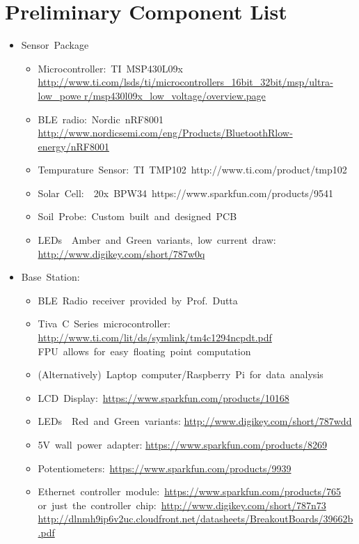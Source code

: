 \documentclass{article}
\begin{document}
\section{Preliminary Component List}
\begin{itemize}
    \item Sensor Package
        \begin{itemize}
            \item Microcontroller: TI MSP430L09x
                \url{http://www.ti.com/lsds/ti/microcontrollers_16­bit_32­bit/msp/ultra­low_powe
                r/msp430l09x_low_voltage/overview.page}
            \item BLE radio: Nordic nRF8001
                \url{http://www.nordicsemi.com/eng/Products/Bluetooth­R­low­energy/nRF8001}
            \item Tempurature Sensor: TI TMP102 http://www.ti.com/product/tmp102
            \item Solar Cell: ~20x BPW34 https://www.sparkfun.com/products/9541
            \item Soil Probe: Custom built and designed PCB
            \item LEDs ­ Amber and Green variants, low current draw:
                \url{http://www.digikey.com/short/787w0q}
        \end{itemize}
    \item Base Station: 
        \begin{itemize}
            \item BLE Radio receiver provided by Prof. Dutta
            \item Tiva C Series microcontroller:
                \url{http://www.ti.com/lit/ds/symlink/tm4c1294ncpdt.pdf}
                FPU allows for easy floating point computation
            \item
                (Alternatively) Laptop computer/Raspberry Pi for data analysis
            \item LCD Display: \url{https://www.sparkfun.com/products/10168}
            \item
                LEDs ­ Red and Green variants:
                \url{http://www.digikey.com/short/787wdd}
            \item 5V wall power adapter:
                \url{https://www.sparkfun.com/products/8269}
            \item Potentiometers: \url{https://www.sparkfun.com/products/9939}
            \item
                Ethernet controller module: \url{https://www.sparkfun.com/products/765}
                or just the controller chip: \url{http://www.digikey.com/short/787n73}
                \url{http://dlnmh9ip6v2uc.cloudfront.net/datasheets/BreakoutBoards/39662b.pdf}
        \end{itemize}
\end{itemize}
\end{document}
